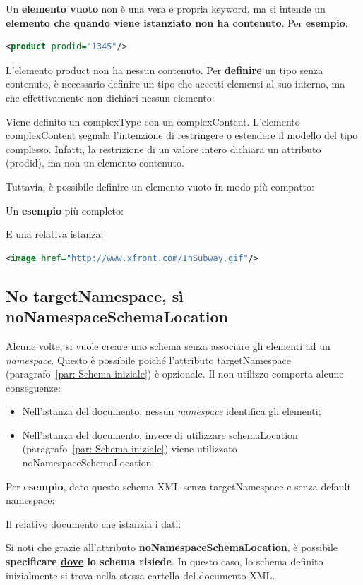 \documentclass[a4paper]{article}
\begin{document}
	Un \textcolor{Red3}{\textbf{elemento vuoto}} non è una vera e propria keyword, ma si intende un \textbf{elemento che quando viene istanziato non ha contenuto}. Per \textcolor{Green4}{\textbf{esempio}}:
	\begin{lstlisting}[language=XML]
<product prodid="1345"/>\end{lstlisting}
	L'elemento \textsf{product} non ha nessun contenuto. Per \textbf{definire} un tipo senza contenuto, è necessario definire un tipo che accetti elementi al suo interno, ma che effettivamente non dichiari nessun elemento:
	
	Viene definito un \textsf{complexType} con un \textsf{complexContent}. L'elemento \textsf{complexContent} segnala l'intenzione di restringere o estendere il modello del tipo complesso. Infatti, la restrizione di un valore intero dichiara un attributo (\textsf{prodid}), ma non un elemento contenuto.\newline
	
	\noindent
	Tuttavia, è possibile definire un elemento vuoto in modo più compatto:
	\:\newline
	
	\noindent
	Un \textcolor{Green4}{\textbf{esempio}} più completo:
	
	E una relativa istanza:
	\begin{lstlisting}[language=XML]
<image href="http://www.xfront.com/InSubway.gif"/>\end{lstlisting}\newpage

	\subsection{No \textsf{targetNamespace}, sì \textsf{noNamespaceSchemaLocation}}
	
	Alcune volte, si vuole creare uno schema senza associare gli elementi ad un \emph{namespace}. Questo è possibile poiché l'attributo \textsf{targetNamespace} (paragrafo~\ref{par: Schema iniziale}) è opzionale. Il non utilizzo comporta alcune conseguenze:
	\begin{itemize}
		\item Nell'istanza del documento, nessun \emph{namespace} identifica gli elementi;
		
		\item Nell'istanza del documento, invece di utilizzare \textsf{schemaLocation} (paragrafo~\ref{par: Schema iniziale}) viene utilizzato \textsf{noNamespaceSchemaLocation}.
	\end{itemize}
	Per \textcolor{Green4}{\textbf{esempio}}, dato questo schema XML senza \textsf{targetNamespace} e senza \textsf{default namespace}:
	
	Il relativo documento che istanzia i dati:
	
	Si noti che grazie all'attributo \textcolor{Red3}{\textbf{\textsf{noNamespaceSchemaLocation}}}, è possibile \textbf{specificare \underline{dove} lo schema risiede}. In questo caso, lo schema definito inizialmente si trova nella stessa cartella del documento XML.\newpage
	
\end{document}
